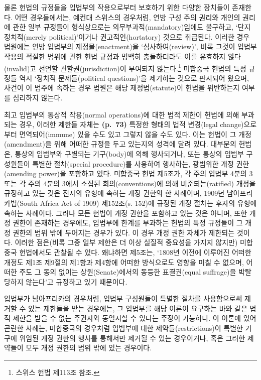 물론 헌법의 규정들을 입법부의 작용으로부터 보호하기 위한 다양한 장치들이
존재한다. 어떤 경우들에서는, 예컨대 스위스의 경우처럼, 연방 구성 주의
권리와 개인의 권리에 관한 일부 규정들이 형식상으로는
의무부과적(mandatory)임에도 불구하고, ‘단지 정치적(merely
political)’이거나 권고적인(hortatory) 것으로 취급된다. 이러한 경우
법원에는 연방 입법부의 제정물(enactment)을 ‘심사하여(review)’, 비록
그것이 입법부 작용의 적절한 범위에 관한 헌법 규정과 명백히 충돌하더라도
이를 유효하지 않다(invalid)고 선언할 관할권(jurisdiction)이 부여되지
않는다.\footnote{스위스 헌법 제113조 참조.} 미합중국 헌법의 특정 규정들
역시 ‘정치적 문제들(political questions)’을 제기하는 것으로 판시되어
왔으며, 사건이 이 범주에 속하는 경우 법원은 해당 제정법(statute)이
헌법을 위반하는지 여부를 심리하지 않는다.

최고 입법부의 통상적 작용(normal operations)에 대한 법적 제한이 헌법에
의해 부과되는 경우, 이러한 제한들 자체는 \textbf{(p.~73)} 특정한 형태의
법적 변경(legal change)으로부터 면역되어(immune) 있을 수도 있고 그렇지
않을 수도 있다. 이는 헌법이 그 개정(amendment)을 위해 어떠한 규정을 두고
있는지의 성격에 달려 있다. 대부분의 헌법은, 통상의 입법부와 구별되는
기구(body)에 의해 행사되거나, 또는 통상의 입법부 구성원들이 특별한
절차(special procedure)를 사용하여 행사하는, 광범위한 개정 권한(amending
power)을 포함하고 있다. 미합중국 헌법 제5조가, 각 주의 입법부 4분의 3
또는 각 주의 4분의 3에서 소집된 회의(conventions)에 의해
비준되는(ratified) 개정을 규정하고 있는 것은 전자의 유형에 속하는 개정
권한의 한 사례이며, 1909년 남아프리카법(South Africa Act of 1909)
제152조(s. 152)에 규정된 개정 절차는 후자의 유형에 속하는 사례이다.
그러나 모든 헌법이 개정 권한을 포함하고 있는 것은 아니며, 또한 개정
권한이 존재하는 경우에도, 입법부에 한계를 부과하는 헌법의 특정 규정들이
그 개정 권한의 범위 밖에 두어지는 경우가 있다. 이 경우 개정 권한 자체가
제한되는 것이다. 이러한 점은(비록 그중 일부 제한은 더 이상 실질적
중요성을 가지지 않지만) 미합중국 헌법에서도 관찰될 수 있다. 왜냐하면
제5조는, ‘1808년 이전에 이루어진 어떠한 개정도 제1조 제9절의 제1항과
제4항에 어떠한 방식으로도 영향을 미칠 수 없으며, 어떠한 주도 그 동의
없이는 상원(Senate)에서의 동등한 표결권(equal suffrage)을 박탈당하지
않는다’고 규정하고 있기 때문이다.

입법부가 남아프리카의 경우처럼, 입법부 구성원들이 특별한 절차를
사용함으로써 제거할 수 있는 제한들을 받는 경우에는, 그 입법부를 해당
이론이 요구하는 바와 같은 법적 제한을 받을 수 없는 주권자와 동일시할 수
있다는 주장이 가능하다. 이 이론에 있어 곤란한 사례는, 미합중국의
경우처럼 입법부에 대한 제약들(restrictions)이 특별한 기구에 위임된 개정
권한의 행사를 통해서만 제거될 수 있는 경우이거나, 혹은 그러한 제약들이
모두 개정 권한의 범위 밖에 있는 경우이다.

